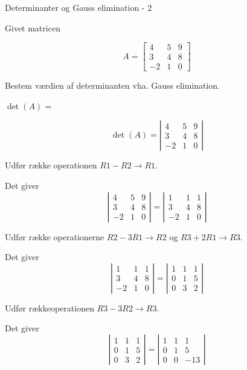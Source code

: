 \documentclass{article}
\begin{document}
\begin{exercise}{Determinanter og Gauss elimination - 2}

Givet matricen

\[
A = \left[\begin{array}{rrr}
4 & 5 & 9 \\
3 & 4 & 8 \\
-2 & 1 & 0
\end{array} \right]
\]

Bestem værdien af determinanten vha. Gauss elimination.

$\det(A)$ = 


\hint
\[
\det(A) = \left|\begin{array}{rrr}
4 & 5 & 9 \\
3 & 4 & 8 \\
-2 & 1 & 0
\end{array} \right|
\]


\hint
Udfør række operationen
$R1 - R2 \to R1$.

\hint
Det giver
\[
\left|\begin{array}{rrr}
4 & 5 & 9 \\
3 & 4 & 8 \\
-2 & 1 & 0
\end{array} \right|
=
\left|\begin{array}{rrr}
1 & 1 & 1 \\
3 & 4 & 8 \\
-2 & 1 & 0
\end{array} \right|
\]

\hint
Udfør række operationerne
$R2 - 3R1 \to R2$ og $R3 + 2R1 \to R3$.

\hint
Det giver
\[
\left|\begin{array}{rrr}
1 & 1 & 1 \\
3 & 4 & 8 \\
-2 & 1 & 0
\end{array} \right|
=
\left|\begin{array}{rrr}
1 & 1 & 1 \\
0 & 1 & 5 \\
0 & 3 & 2
\end{array} \right|
\]

\hint
Udfør rækkeoperationen
$R3 - 3R2 \to R3$.

\hint
Det giver
\[
\left|\begin{array}{rrr}
1 & 1 & 1 \\
0 & 1 & 5 \\
0 & 3 & 2
\end{array} \right|
=
\left|\begin{array}{rrr}
1 & 1 & 1 \\
0 & 1 & 5 \\
0 & 0 & -13
\end{array} \right|
\]


\end{exercise}
\end{document}
